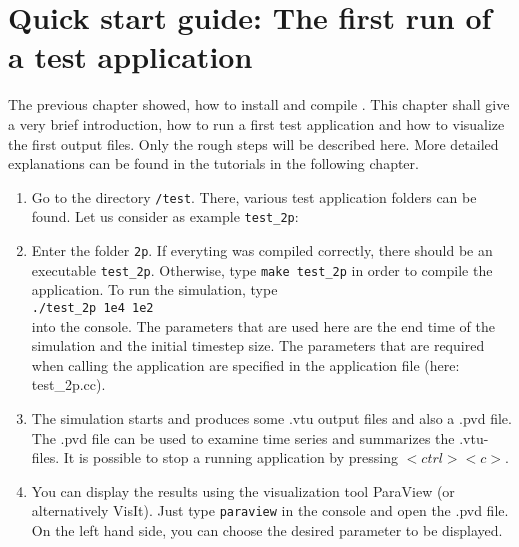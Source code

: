 \section[Quick start guide]{Quick start guide: The first run of a test application}\label{quick-start-guide}

The previous chapter showed, how to install and compile \Dumux. This chapter shall give a very brief introduction, how to run a first test application and how to visualize the first output files. Only the rough steps will be described here. More detailed explanations can be found in the tutorials in the following chapter.

\begin{enumerate}
 \item Go to the directory \texttt{/test}. There, various test application folders can be found. Let us consider as example \texttt{test{\_}2p}:
 \item Enter the folder \texttt{2p}. If everyting was compiled correctly, there should be an executable \texttt{test{\_}2p}. Otherwise, type \texttt{make test{\_}2p} in order to compile the application. To run the simulation, type\\ 
\texttt{./test{\_}2p 1e4 1e2}\\
into the console. The parameters that are used here are the end time of the simulation and the initial timestep size. The parameters that are required when calling the application are specified in the application file (here: test{\_}2p.cc).
 \item The simulation starts and produces some .vtu output files and also a .pvd file. The .pvd file can be used to examine time series and summarizes the .vtu-files. It is possible to stop a running application by pressing $<ctrl><c>$.
 \item You can display the results using the visualization tool ParaView (or alternatively VisIt). Just type \texttt{paraview} in the console and open the .pvd file. On the left hand side, you can choose the desired parameter to be displayed.
\end{enumerate}
% 
%
%


